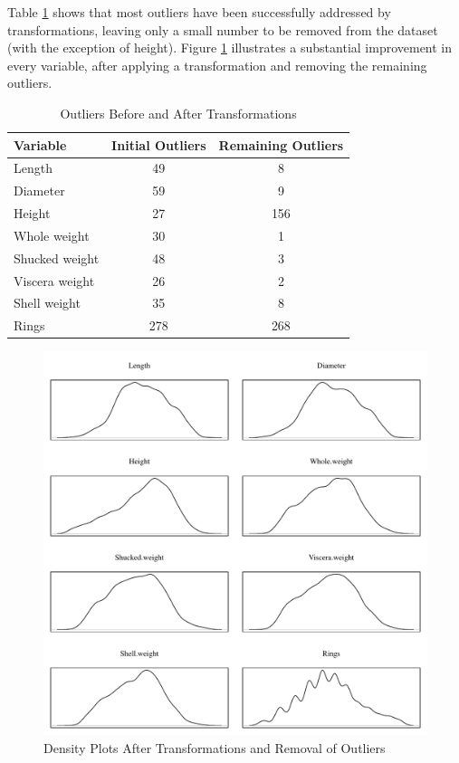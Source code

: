 \documentclass[11pt, a4paper]{article}
\begin{document}
    Table \ref{outliers} shows that most outliers have been successfully addressed by transformations, leaving only a small number to be removed from the dataset (with the exception of height). Figure \ref{density.t} illustrates a substantial improvement in every variable, after applying a transformation and removing the remaining outliers. 
    
    \begin{table}[ht]
        \centering
        \begin{tabular}{|l|c|c|}
            \hline
            Variable&Initial Outliers&Remaining Outliers \\
            \hline
            Length & 49 & 8 \\
            Diameter & 59 & 9 \\
            Height & 27 & 156 \\
            Whole weight & 30 & 1 \\
            Shucked weight & 48 & 3 \\
            Viscera weight & 26 & 2 \\
            Shell weight & 35 & 8 \\
            Rings & 278 & 268 \\
            \hline
        \end{tabular}
        \caption{Outliers Before and After Transformations}
        \label{outliers}
    \end{table}

    \begin{figure}[hbt!]
        \centering
        \includegraphics[width=\textwidth]{1.7.pdf}
        \caption{Density Plots After Transformations and Removal of Outliers}
        \label{density.t}
    \end{figure}
\end{document}
